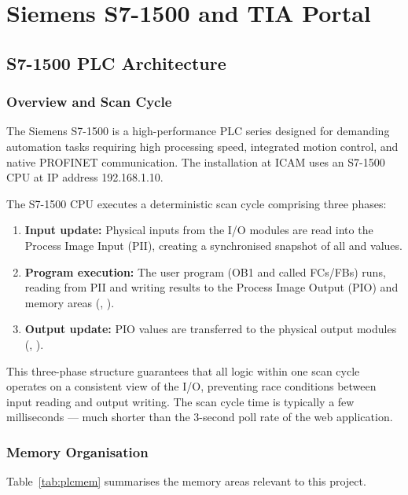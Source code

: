 \chapter{Siemens S7-1500 and TIA Portal}

\section{S7-1500 PLC Architecture}

\subsection{Overview and Scan Cycle}

The Siemens S7-1500 is a high-performance PLC series designed for demanding automation
tasks requiring high processing speed, integrated motion control, and native PROFINET
communication. The installation at ICAM uses an S7-1500 CPU at IP address 192.168.1.10.

The S7-1500 CPU executes a deterministic scan cycle comprising three phases:

\begin{enumerate}[leftmargin=*, itemsep=3pt]
  \item \textbf{Input update:} Physical inputs from the I/O modules are read into the
    Process Image Input (PII), creating a synchronised snapshot of all  and
     values.
  \item \textbf{Program execution:} The user program (OB1 and called FCs/FBs) runs,
    reading from PII and writing results to the Process Image Output (PIO) and memory
    areas (, ).
  \item \textbf{Output update:} PIO values are transferred to the physical output modules
    (, ).
\end{enumerate}

This three-phase structure guarantees that all logic within one scan cycle operates on a
consistent view of the I/O, preventing race conditions between input reading and output
writing. The scan cycle time is typically a few milliseconds --- much shorter than the
3-second poll rate of the web application.

\subsection{Memory Organisation}

Table~\ref{tab:plcmem} summarises the memory areas relevant to this project.

